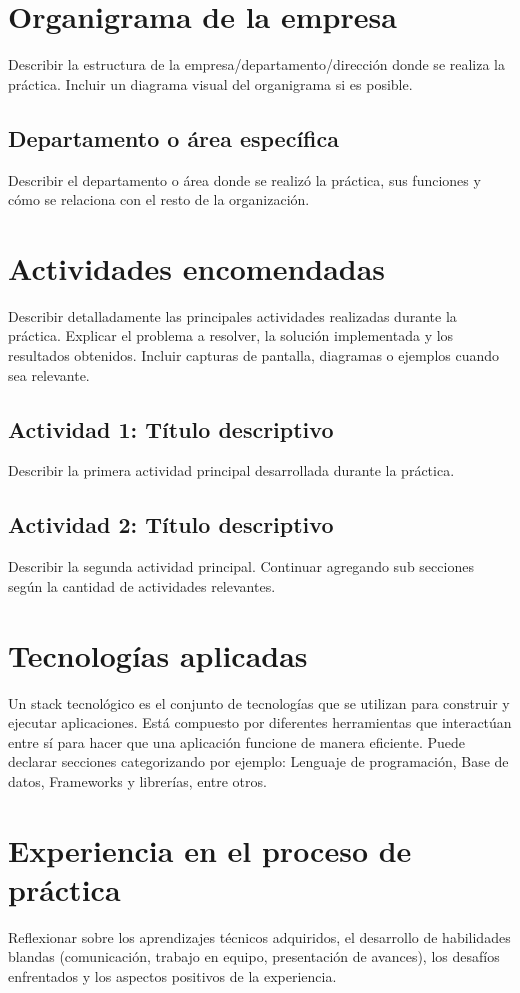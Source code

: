 \documentclass[12pt, a4paper]{article}
\begin{document}
\section{Organigrama de la empresa}
Describir la estructura de la empresa/departamento/dirección donde se realiza la práctica. Incluir un diagrama visual del organigrama si es posible.

\subsection{Departamento o área específica}
Describir el departamento o área donde se realizó la práctica, sus funciones y cómo se relaciona con el resto de la organización.

\section{Actividades encomendadas}
Describir detalladamente las principales actividades realizadas durante la práctica. Explicar el problema a resolver, la solución implementada y los resultados obtenidos. Incluir capturas de pantalla, diagramas o ejemplos cuando sea relevante.

\subsection{Actividad 1: Título descriptivo}
Describir la primera actividad principal desarrollada durante la práctica.

\subsection{Actividad 2: Título descriptivo}
Describir la segunda actividad principal. Continuar agregando sub secciones según la cantidad de actividades relevantes.

\section{Tecnologías aplicadas}
Un stack tecnológico es el conjunto de tecnologías que se utilizan para construir y ejecutar aplicaciones. Está compuesto por diferentes herramientas que interactúan entre sí para hacer que una aplicación funcione de manera eficiente. Puede declarar secciones categorizando por ejemplo: Lenguaje de programación, Base de datos, Frameworks y librerías, entre otros.

\section{Experiencia en el proceso de práctica}
Reflexionar sobre los aprendizajes técnicos adquiridos, el desarrollo de habilidades blandas (comunicación, trabajo en equipo, presentación de avances), los desafíos enfrentados y los aspectos positivos de la experiencia.
\end{document}
